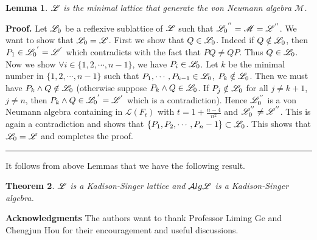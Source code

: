 \documentclass[12pt]{article}
\newtheorem{theorem}{Theorem}
\newtheorem{lemma}[theorem]{Lemma}
\newenvironment{proof}[1][Proof]{\textbf{#1.} }{\ \rule{0.5em}{0.5em}}
\def\M{{\mathscr{ M}}}
\def\Alg{\mathcal Alg}
\begin{document}
\begin{lemma} ${\mathscr{L}}$ is the minimal lattice that generate the von Neumann algebra $\M$. \end{lemma}

\noindent\begin{proof}  Let ${\mathscr{L}}_0$ be a reflexive sublattice of ${\mathscr{L}}$ such that ${\L_0}^{''}=\M=\L^{''}$. We want to show that ${\mathscr{L}}_0={\mathscr{L}}$.
First we show that $Q\in {\mathscr{L}}_0$. Indeed if $Q\notin {\mathscr{L}}_0$, then $P_1\in {{\mathscr{L}}_0}^{'}={\mathscr{L}}^{'}$ which contradicts with the fact that $PQ\neq QP$. Thus $Q\in {\mathscr{L}}_0$.
Now we show $\forall i\in \{1, 2, \cdots, n-1\}$, we have $P_i\in {\mathscr{L}}_0$.
Let $k$ be the minimal number in $\{1, 2, \cdots, n-1\}$ such that $P_1, \cdots, P_{k-1}\in {\mathscr{L}}_0$, $P_k\notin {\mathscr{L}}_0$.
Then we must have $P_{k}\wedge Q\notin {\mathscr{L}}_0$ (otherwise suppose $P_k\wedge Q\in {\mathscr{L}}_0$. If $P_j\notin {\mathscr{L}}_0$ for all $j\neq k+1$, $j\neq n$, then $P_{k}\wedge Q\in {{\mathscr{L}}_0}^{'}={\mathscr{L}}^{'}$ which is a contradiction). Hence ${\mathscr{L}}_{0}^{''}$ is a von Neumann algebra containing in $\mathscr{L}(F_t)$ with $t=1+\frac{n-4}{n^2}$ and ${\mathscr{L}}_{0}^{''}\neq {\mathscr{L}}^{''}$. This is again a contradiction and shows that $\{P_1, P_2, \cdots, P_n-1\}\subset {\mathscr{L}}_0$.
This shows that ${\mathscr{L}}_0={\mathscr{L}}$ and completes the proof. \end{proof}\newline

It follows from above Lemmas that we have the following result.\newline


\begin{theorem} ${\mathscr{L}}$ is a Kadison-Singer lattice and $\Alg\L$ is a Kadison-Singer algebra.\end{theorem}




\noindent\textbf{Acknowledgments} The authors want to thank
Professor  Liming Ge and Chengjun Hou for their encouragement and useful discussions.
\newline
\end{document}
